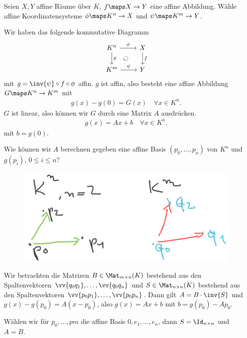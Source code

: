 Seien \( X,Y \) affine Räume über \( K \), \( f\maps X\to Y \) eine affine Abbildung. Wähle affine Koordinatensysteme \( \phi\maps K^n\to X  \) und \( \psi\maps K^m\to Y \).

Wir haben das folgende kommutative Diagramm
\begin{equation*}
    \begin{tikzcd}
        K^n\arrow{r}{\phi}\arrow{d}[name=g]{g} &X\arrow{d}[name=f]{f}\\
        K^m\arrow{r}{\psi}&Y
        \arrow[to path={(f) node[midway,scale=1] {\rotatebox{90}{\(\circlearrowright\)}} (g)}]{} 
    \end{tikzcd}    
\end{equation*}
mit \( g=\inv{\psi}\circ f\circ \phi \) affin. \( g \) ist affin, also besteht eine affine Abbildung \( G\maps K^n\to K^m \) mit
\begin{align*}
    g(x)-g(0)=G(x)\quad \forall x\in K^n.
\end{align*}
\( G \) ist linear, also können wir \( G \) durch eine Matrix \( A \) ausdrücken.
\begin{align*}
    g(x)=Ax+b\quad \forall x\in K^n.
\end{align*}
mit \( b=g(0) \).
\begin{frage*}
    Wie können wir \( A \) berechnen gegeben eine affine Basis \( (p_0,\dotsc,p_n) \) von \( K^n \) und \( g(p_i) \), \( 0\leq i \leq n \)?
\end{frage*}
\begin{figure}[H]
    \centering
    \includegraphics[width=0.5\linewidth]{figures/affine_basen_abbildung_wunsch}
    \label{fig:affine_basen_abbildung_wunsch}
\end{figure}
Wir betrachten die Matrizen \( B\in \Mat_{m\times n}(K) \) bestehend aus den Spaltenvektoren \( \vv{q_0 q_1},\dotsc, \vv{q_0 q_n} \) und \( S\in \Mat_{n\times n}(K) \) bestehend aus den Spaltenvektoren \( \vv{p_0 p_1}, \dotsc, \vv{p_0 p_n} \). Dann gilt \( A=B\cdot \inv{S}  \) und \( g(x)-g(p_0)=A(x-p_0) \), also \( g(x)=Ax+b \) mit \( b=g(p_0)-Ap_0 \).
\begin{bemerkung*}
    Wählen wir für \( p_0,\dotsc,pm \) die affine Basis \( 0,e_1,\dotsc, e_n \), dann \( S=\Id_{n\times n} \) und \( A=B \).
\end{bemerkung*}
